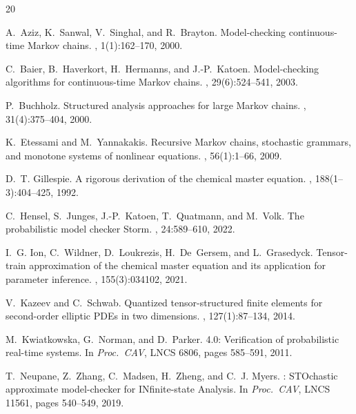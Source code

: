 \documentclass[11pt]{article}
\begin{document}

\begin{thebibliography}{20}

A.~Aziz, K.~Sanwal, V.~Singhal, and R.~Brayton.
\newblock Model-checking continuous-time {M}arkov chains.
, 1(1):162--170, 2000.

C.~Baier, B.~Haverkort, H.~Hermanns, and J.-P.~Katoen.
\newblock Model-checking algorithms for continuous-time {M}arkov chains.
, 29(6):524--541, 2003.

P.~Buchholz.
\newblock Structured analysis approaches for large {M}arkov chains.
, 31(4):375--404, 2000.

K.~Etessami and M.~Yannakakis.
\newblock Recursive {M}arkov chains, stochastic grammars, and monotone systems
  of nonlinear equations.
, 56(1):1--66, 2009.

D.~T. Gillespie.
\newblock A rigorous derivation of the chemical master equation.
, 188(1--3):404--425, 1992.

C.~Hensel, S.~Junges, J.-P.~Katoen, T.~Quatmann, and M.~Volk.
\newblock The probabilistic model checker {S}torm.
, 24:589--610, 2022.

I.~G. Ion, C.~Wildner, D.~Loukrezis, H.~De~Gersem, and
  L.~Grasedyck.
\newblock Tensor-train approximation of the chemical master equation
  and its application for parameter inference.
, 155(3):034102, 2021.

V.~Kazeev and C.~Schwab.
\newblock Quantized tensor-structured finite elements for second-order
  elliptic {PDE}s in two dimensions.
, 127(1):87--134, 2014.

M.~Kwiatkowska, G.~Norman, and D.~Parker.
 4.0: Verification of probabilistic real-time systems.
\newblock In {\em Proc.\ CAV}, LNCS 6806, pages 585--591, 2011.

T.~Neupane, Z.~Zhang, C.~Madsen, H.~Zheng, and C.~J. Myers.
: {STO}chastic approximate model-checker for
  {IN}finite-state {A}nalysis.
\newblock In {\em Proc.\ CAV}, LNCS 11561, pages 540--549, 2019.


\end{thebibliography}
\end{document}
